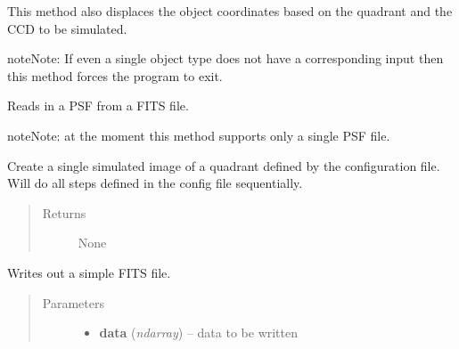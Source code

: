 \documentclass[a4paper,12pt,english]{sphinxmanual}
\begin{document}
\begin{fulllineitems}
\begin{fulllineitems}
This method also displaces the object coordinates based on the quadrant and the
CCD to be simulated.

\begin{notice}{note}{Note:}
If even a single object type does not have a corresponding input then this method
forces the program to exit.
\end{notice}

\end{fulllineitems}


\begin{fulllineitems}
\label{simulator:simulator.simulator.VISsimulator.readPSFs}
Reads in a PSF from a FITS file.

\begin{notice}{note}{Note:}
at the moment this method supports only a single PSF file.
\end{notice}

\end{fulllineitems}


\begin{fulllineitems}
\label{simulator:simulator.simulator.VISsimulator.simulate}
Create a single simulated image of a quadrant defined by the configuration file.
Will do all steps defined in the config file sequentially.
\begin{quote}\begin{description}
\item[{Returns}] \leavevmode
None

\end{description}\end{quote}

\end{fulllineitems}


\begin{fulllineitems}
\label{simulator:simulator.simulator.VISsimulator.writeFITSfile}
Writes out a simple FITS file.
\begin{quote}\begin{description}
\item[{Parameters}] \leavevmode\begin{itemize}
\item {} 
\textbf{data} (\emph{ndarray}) -- data to be written


\end{itemize}
\end{description}
\end{quote}
\end{fulllineitems}
\end{fulllineitems}
\end{document}
